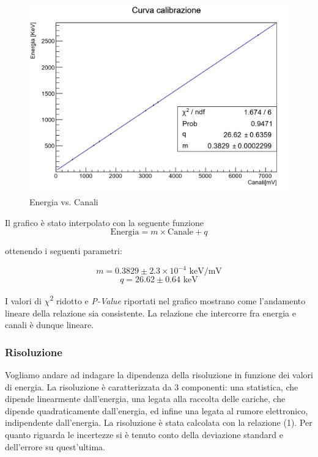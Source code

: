 \documentclass[a4paper,10pt]{article}
\newcommand*{\unit}[1]{\ensuremath{\mathrm{\,#1}}}
\begin{document}
\begin{figure}[H]
    \centering
    \includegraphics[scale=0.45]{grafici/rettacalibrazionesources}
    \caption{Energia vs. Canali}
\end{figure}

Il grafico \`e stato interpolato con la seguente funzione 
\begin{equation}
	\textrm{Energia} = m \times \textrm{Canale} + q
\end{equation}

ottenendo i seguenti parametri:

$$
	m=0.3829 \pm 2.3 \times 10^{-4}\, \unit{keV/mV}
$$
$$
	q=26.62 \pm 0.64\, \unit{keV}
$$

\noindent I valori di $\chi$\textsuperscript{2} ridotto e \textit{P-Value} riportati nel grafico mostrano come l'andamento lineare della relazione sia consistente. La relazione che intercorre fra energia e canali \`e dunque lineare.


\subsubsection{Risoluzione}
Vogliamo andare ad indagare la dipendenza della risoluzione in funzione dei valori di energia. La risoluzione \`e caratterizzata da 3 componenti: una statistica, che dipende linearmente dall'energia, una legata alla raccolta delle cariche, che dipende quadraticamente dall'energia, ed infine una legata al rumore elettronico, indipendente dall'energia. La risoluzione \`e stata calcolata con la relazione (1). Per quanto riguarda le incertezze si \`e tenuto conto della deviazione standard e dell'errore su quest'ultima. 
\end{document}
